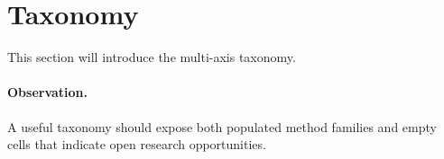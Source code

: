 \section{Taxonomy}

This section will introduce the multi-axis taxonomy.

\paragraph{Observation.}
A useful taxonomy should expose both populated method families and empty cells that indicate open research opportunities.

